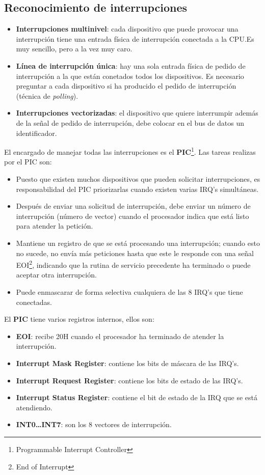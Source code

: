 \subsection{Reconocimiento de interrupciones}

\begin{itemize}
  \item \textbf{Interrupciones multinivel}: cada dispositivo que puede provocar una interrupción tiene una entrada física de interrupción conectada a la CPU.\@ Es muy sencillo, pero a la vez muy caro.
  \item \textbf{Línea de interrupción única}: hay una sola entrada física de pedido de interrupción a la que están conetados todos los dispositivos. Es necesario preguntar a cada dispositivo si ha producido el pedido de interrupción (técnica de \textit{polling}).
  \item \textbf{Interrupciones vectorizadas}: el dispositivo que quiere interrumpir además de la señal de pedido de interrupción, debe colocar en el bus de datos un identificador.
\end{itemize}

El encargado de manejar todas las interrupciones es el \textbf{PIC}\footnote{Programmable Interrupt Controller}. Las tareas realizas por el PIC son:

\begin{itemize}
  \item Puesto que existen muchos dispositivos que pueden solicitar interrupciones, es responsabilidad del PIC priorizarlas cuando existen varias IRQ's simultáneas.
  \item Después de enviar una solicitud de interrupción, debe enviar un número de interrupción (número de vector) cuando el procesador indica que está listo para atender la petición.
  \item Mantiene un registro de que se está procesando una interrupción; cuando esto no sucede, no envía más peticiones hasta que este le responde con una señal EOI\footnote{End of Interrupt}, indicando que la rutina de servicio precedente ha terminado o puede aceptar otra interrupción.
  \item Puede enmascarar de forma selectiva cualquiera de las 8 IRQ's que tiene conectadas.
\end{itemize}

El \textbf{PIC} tiene varios registros internos, ellos son:

\begin{itemize}
  \item \textbf{EOI}: recibe 20H cuando el procesador ha terminado de atender la interrupción.
  \item \textbf{Interrupt Mask Register}: contiene los bits de máscara de las IRQ's.
  \item \textbf{Interrupt Request Register}: contiene los bits de estado de las IRQ's.
  \item \textbf{Interrupt Status Register}: contiene el bit de estado de la IRQ que se está atendiendo.
  \item \textbf{INT0\ldots INT7}: son los 8 vectores de interrupción.
\end{itemize}